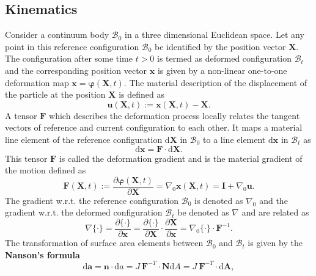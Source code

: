 \subsection{Kinematics}
Consider a continuum body $\mathcal{B}_0$ in a three dimensional Euclidean space. Let any point in this reference configuration $\mathcal{B}_0$ be identified by the position vector $\mathbf{X}$. The configuration after some time $t > 0$ is termed as deformed configuration $\mathcal{B}_t$ and the corresponding position vector $\mathbf{x}$ is given by a non-linear one-to-one deformation map $\mathbf{x} = \bm{\varphi} (\mathbf{X}, t)$. The material description of the displacement of the particle at the position $\mathbf{X}$ is defined as
\begin{equation}
\mathbf{u}(\mathbf{X}, t) := \mathbf{x}(\mathbf{X}, t) - \mathbf{X}.
\end{equation}
A tensor $\mathbf{F}$ which describes the deformation process locally relates the tangent vectors of reference and current configuration to each other. It maps a material line element of the reference configuration $\bm{\mathrm{d}}\mathbf{X}$ in $\mathcal{B}_0$ to a line element $\bm{\mathrm{d}\mathbf{x}}$ in $\mathcal{B}_t$ as 
\begin{equation}
\bm{\mathrm{d}\mathbf{x}} = \mathbf{F} \cdot \bm{\mathrm{d}\mathbf{X}}.
\end{equation} 
This tensor $\mathbf{F}$ is called the deformation gradient and is the material gradient of the motion defined as
\begin{equation}
\mathbf{F}(\mathbf{X}, t) := \dfrac{\partial \bm{\varphi}(\mathbf{X}, t)}{\partial \mathbf{X}} = \nabla_0 \mathbf{x}(\mathbf{X}, t) = \mathbf{I} + \nabla_0 \mathbf{u}.
\label{eq:1.3}
\end{equation}
The gradient w.r.t. the reference configuration $\mathcal{B}_0$ is denoted as $\nabla_0$ and the gradient w.r.t. the deformed configuration $\mathcal{B}_t$ be denoted as $\nabla$ and are related as 
\begin{equation}
\nabla \{ \cdot \} = \dfrac{\partial \{ \cdot \} }{\partial \mathbf{x}} = \dfrac{\partial \{ \cdot \} }{\partial \mathbf{X}} \cdot \dfrac{\partial \mathbf{X}}{\partial \mathbf{x}} = \nabla_0 \{ \cdot \} \cdot \mathbf{F}^{-1}.
\end{equation} 
The transformation of surface area elements between $\mathcal{B}_0$ and $\mathcal{B}_t$ is given by the \textbf{Nanson's formula}
\begin{equation}
\bm{\mathrm{d}}\mathbf{a} = \mathbf{n} \cdot \mathrm{d}a = J \ \mathbf{F}^{-T} \cdot \mathbf{N} \mathrm{d}A = J \ \mathbf{F}^{-T} \cdot \bm{\mathrm{d}}\mathbf{A},
\end{equation}
